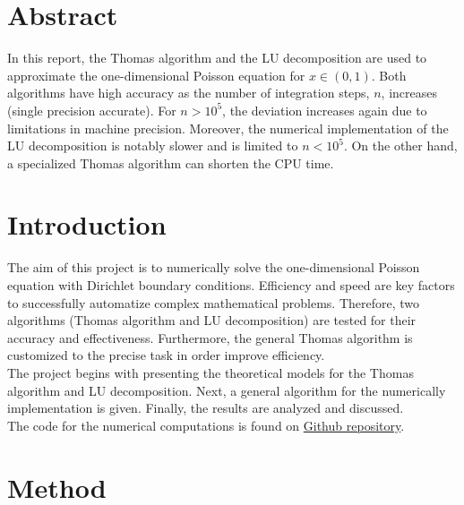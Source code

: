 \documentclass[%
oneside,                 %
final,                   %
10pt]{article}
\begin{document}





\newcommand{\exercisesection}[1]{\subsection*{#1}}






\thispagestyle{empty}


\section*{Abstract}
In this report, the Thomas algorithm and the LU decomposition are used to approximate the one-dimensional Poisson equation for $x\in(0,1)$.
Both algorithms have high accuracy as the number of integration steps, $n$, increases (single precision accurate).
For $n>10^5$, the deviation increases again due to limitations in machine precision.
Moreover, the numerical implementation of the LU decomposition is notably slower and is limited to $n<10^5$.
On the other hand, a specialized Thomas algorithm can shorten the CPU time.

\section*{Introduction}
The aim of this project is to numerically solve the one-dimensional Poisson equation with Dirichlet boundary conditions. 
Efficiency and speed are key factors to successfully automatize complex mathematical problems. 
Therefore, two algorithms (Thomas algorithm and LU decomposition) are tested for their accuracy and effectiveness. 
Furthermore, the general Thomas algorithm is customized to the precise task in order improve efficiency. \\
The project begins with presenting the theoretical models for the Thomas algorithm and LU decomposition. 
Next, a general algorithm for the numerically implementation is given.
Finally, the results are analyzed and discussed. \\
The code for the numerical computations is found on
\href{https://github.com/EliasTRuud/FYS3150/tree/master/Project1}{Github repository}.

\section*{Method}
\end{document}
